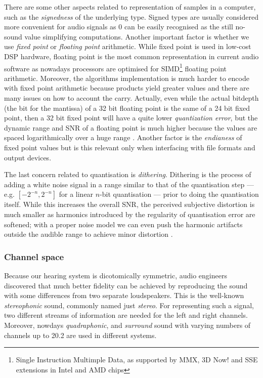 There are some other aspects related to representation of samples in a
computer, such as the \emph{signedness} of the underlying type. Signed
types are usually considered more convenient for audio signals as 0
can be easily recognised as the still no-sound value simplifying
computations. Another important factor is whether we use \emph{fixed
  point} or \emph{floating point} arithmetic. While fixed point is
used in low-cost DSP hardware, floating point is the most common
representation in current audio software as nowadays processors are
optimised for SIMD\footnote{Single Instruction Multimple Data, as
  supported by MMX, 3D Now! and SSE extensions in Intel and AMD chips}
floating point arithmetic. Moreover, the algorithms implementation is
much harder to encode with fixed point arithmetic because products
yield greater values and there are many issues on how to account the
carry.  Actually, even while the actual bitdepth (the bit for the
mantissa) of a 32 bit floating point is the same of a 24 bit fixed
point, then a 32 bit fixed point will have a quite lower
\emph{quantization error}, but the dynamic
range and SNR of a floating point is much higher because the values
are spaced logarithmically over a huge range
\cite{smith02dsp}. Another factor is the \emph{endianess} of fixed
point values but is this relevant only when interfacing with file
formats and output devices.

The last concern related to quantisation is
\emph{dithering}. Dithering is the process of adding
a white noise signal in a range similar to that of the quantisation
step --- e.g. $[-2^{-n}, 2^{-n}]$ for a linear $n$-bit quantisation
--- prior to doing the quantisation itself. While this increases the
overall SNR, the perceived subjective distortion is much smaller as
harmonics introduced by the regularity of quantisation error are
softened; with a proper noise model we can even push the harmonic
artifacts outside the audible range to achieve minor distortion
\cite{vanderkooy87dither, lipshitz91minimally}.

\subsubsection{Channel space}

Because our hearing system is dicotomically
symmetric, audio engineers discovered that much better fidelity can be
achieved by reproducing the sound with some differences from two
separate loudspeakers. This is the well-known
\emph{stereophonic} sound, commonly named just
\emph{stereo}. For representing such a signal, two different streams
of information are needed for the left and right channels. Moreover,
nowdays \emph{quadraphonic}, and \emph{surround} sound with varying numbers of channels up to
20.2 are used in different systems.

